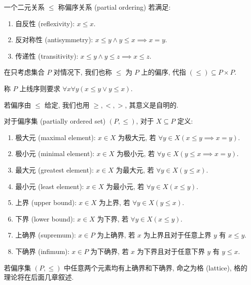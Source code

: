\begin{definition}
    一个二元关系 \(\le\) 称偏序关系 (partial ordering) 若满足:

    \begin{enumerate}
        \item 自反性 (reflexivity): \(x \le x\).
        \item 反对称性 (antisymmetry): \(x \le y \land y \le x \implies x = y\).
        \item 传递性 (transitivity): \(x \le y \land y \le z \implies x \le z\).
    \end{enumerate}

    在只考虑集合 \(P\) 对情况下, 我们也称 \(\le\) 为 \(P\) 上的偏序, 代指 \((\le) \subseteq P \times P\).

    称 \(P\) 上线序则要求 \(\forall x \forall y (x \le y \lor y \le x)\).

    若偏序由 \(\le\) 给定, 我们也用 \(\ge, <, >\), 其意义是自明的.
\end{definition}

\begin{definition}
    对于偏序集 (partially ordered set) \((P, \le)\), 对于 \(X \subseteq P\) 定义:
    \begin{enumerate}
        \item 极大元 (maximal element): \(x \in X\) 为极大元, 若 \(\forall y \in X (x \le y \implies x = y)\).
        \item 极小元 (minimal element): \(x \in X\) 为极小元, 若 \(\forall y \in X (y \le x \implies x = y)\).
        \item 最大元 (greatest element): \(x \in X\) 为最大元, 若 \(\forall y \in X (y \le x)\).
        \item 最小元 (least element): \(x \in X\) 为最小元, 若 \(\forall y \in X (x \le y)\).
        \item 上界 (upper bound): \(x \in X\) 为上界, 若 \(\forall y \in X (y \le x)\).
        \item 下界 (lower bound): \(x \in X\) 为下界, 若 \(\forall y \in X (x \le y)\).
        \item 上确界 (supremum): \(x \in P\) 为上确界, 若 \(x\) 为上界且对于任意上界 \(y\) 有 \(x \le y\).
        \item 下确界 (infimum): \(x \in P\) 为下确界, 若 \(x\) 为下界且对于任意下界 \(y\) 有 \(y \le x\).
    \end{enumerate}
\end{definition}

\begin{definition}
    若偏序集 \((P, \le)\) 中任意两个元素均有上确界和下确界, 命之为格 (lattice), 格的理论将在后面几章叙述.
\end{definition}

